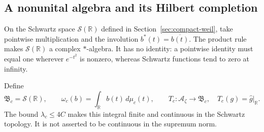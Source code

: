 \documentclass[11pt]{article}
\theoremstyle{definition}
\theoremstyle{remark}
\numberwithin{equation}{section}
\newcommand{\cA}{\mathcal A}
\newcommand{\R}{\mathbb R}
\begin{document}
\subsection{A nonunital algebra and its Hilbert completion}

On the Schwartz space $\mathscr S(\R)$ defined in
Section~\ref{sec:compact-weil}, take pointwise multiplication and the involution
$b^*(t)=\overline{b(t)}$.
The product rule makes $\mathscr S(\R)$ a complex $*$-algebra.
It has no identity: a pointwise identity must equal one wherever
$e^{-t^2}$ is nonzero, whereas Schwartz functions tend to zero at infinity.



Define
\begin{equation}
 \mathfrak B_c=\mathscr S(\R),\qquad
 \omega_c(b)=\int_{\R}b(t)\,d\mu_c(t),\qquad
 T_c:\cA_\zeta\longrightarrow\mathfrak B_c,
 \quad T_c(g)=\widehat g|_{\R}.
 \label{eq:wp-carrier}
\end{equation}
The bound $\lambda_c\leq4C$ makes this integral finite and continuous
in the Schwartz topology.
It is not asserted to be continuous in the supremum norm.
\end{document}
